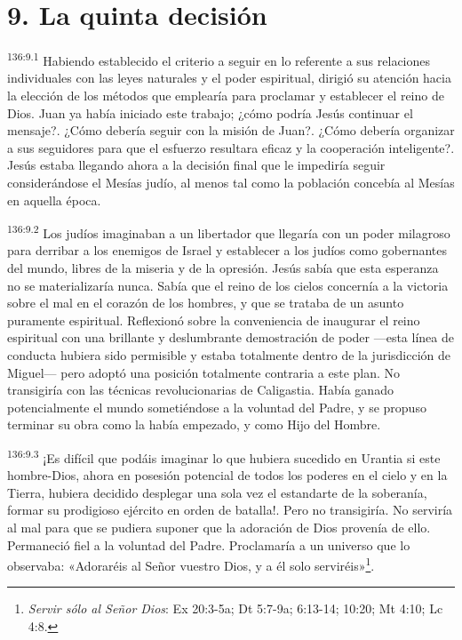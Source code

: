 \section*{9. La quinta decisión}
\par
\textsuperscript{136:9.1} Habiendo establecido el criterio a seguir en lo referente a sus relaciones individuales con las leyes naturales y el poder espiritual, dirigió su atención hacia la elección de los métodos que emplearía para proclamar y establecer el reino de Dios. Juan ya había iniciado este trabajo; ¿cómo podría Jesús continuar el mensaje?. ¿Cómo debería seguir con la misión de Juan?. ¿Cómo debería organizar a sus seguidores para que el esfuerzo resultara eficaz y la cooperación inteligente?. Jesús estaba llegando ahora a la decisión final que le impediría seguir considerándose el Mesías judío, al menos tal como la población concebía al Mesías en aquella época.

\par
\textsuperscript{136:9.2} Los judíos imaginaban a un libertador que llegaría con un poder milagroso para derribar a los enemigos de Israel y establecer a los judíos como gobernantes del mundo, libres de la miseria y de la opresión. Jesús sabía que esta esperanza no se materializaría nunca. Sabía que el reino de los cielos concernía a la victoria sobre el mal en el corazón de los hombres, y que se trataba de un asunto puramente espiritual. Reflexionó sobre la conveniencia de inaugurar el reino espiritual con una brillante y deslumbrante demostración de poder ---esta línea de conducta hubiera sido permisible y estaba totalmente dentro de la jurisdicción de Miguel--- pero adoptó una posición totalmente contraria a este plan. No transigiría con las técnicas revolucionarias de Caligastia. Había ganado potencialmente el mundo sometiéndose a la voluntad del Padre, y se propuso terminar su obra como la había empezado, y como Hijo del Hombre.

\par
\textsuperscript{136:9.3} ¡Es difícil que podáis imaginar lo que hubiera sucedido en Urantia si este hombre-Dios, ahora en posesión potencial de todos los poderes en el cielo y en la Tierra, hubiera decidido desplegar una sola vez el estandarte de la soberanía, formar su prodigioso ejército en orden de batalla!. Pero no transigiría. No serviría al mal para que se pudiera suponer que la adoración de Dios provenía de ello. Permaneció fiel a la voluntad del Padre. Proclamaría a un universo que lo observaba: «Adoraréis al Señor vuestro Dios, y a él solo serviréis»\footnote{\textit{Servir sólo al Señor Dios}: Ex 20:3-5a; Dt 5:7-9a; 6:13-14; 10:20; Mt 4:10; Lc 4:8.}.


